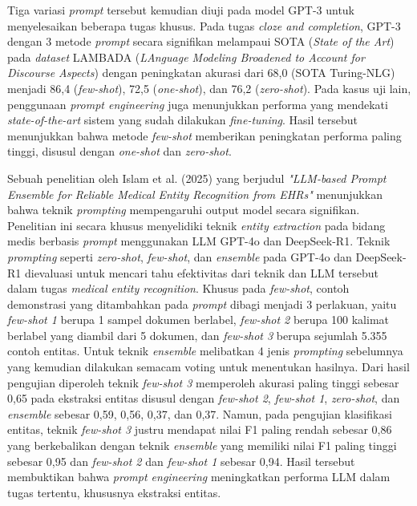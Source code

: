 Tiga variasi \textit{prompt} tersebut kemudian diuji pada model GPT-3 untuk menyelesaikan beberapa tugas khusus.
Pada tugas \textit{cloze and completion}, GPT-3 dengan 3 metode \textit{prompt} secara signifikan melampaui SOTA (\textit{State of the Art}) pada \textit{dataset}
LAMBADA (\textit{LAnguage Modeling Broadened to Account for Discourse Aspects}) dengan peningkatan akurasi dari 68,0 (SOTA Turing-NLG) menjadi 86,4 (\textit{few-shot}), 72,5 (\textit{one-shot}), dan 76,2 (\textit{zero-shot}).
Pada kasus uji lain, penggunaan \textit{prompt engineering} juga menunjukkan performa yang mendekati \textit{state-of-the-art} sistem yang sudah dilakukan \textit{fine-tuning}.
Hasil tersebut menunjukkan bahwa metode \textit{few-shot} memberikan peningkatan performa paling tinggi, disusul dengan \textit{one-shot} dan \textit{zero-shot}.

Sebuah penelitian oleh Islam et al. (2025) yang berjudul \textit{"LLM-based Prompt Ensemble for Reliable Medical Entity Recognition from EHRs"} menunjukkan bahwa teknik \textit{prompting} mempengaruhi output model secara signifikan.
Penelitian ini secara khusus menyelidiki teknik \textit{entity extraction} pada bidang medis berbasis \textit{prompt} menggunakan LLM GPT-4o dan DeepSeek-R1.
Teknik \textit{prompting} seperti \textit{zero-shot}, \textit{few-shot}, dan \textit{ensemble} pada GPT-4o dan DeepSeek-R1 dievaluasi untuk mencari tahu efektivitas dari teknik dan LLM tersebut dalam tugas \textit{medical entity recognition}.
Khusus pada \textit{few-shot}, contoh demonstrasi yang ditambahkan pada \textit{prompt} dibagi menjadi 3 perlakuan, yaitu \textit{few-shot 1} berupa 1 sampel dokumen berlabel, \textit{few-shot 2} berupa 100 kalimat berlabel yang diambil dari 5 dokumen, dan \textit{few-shot 3} berupa sejumlah 5.355 contoh entitas.
Untuk teknik \textit{ensemble} melibatkan 4 jenis \textit{prompting} sebelumnya yang kemudian dilakukan semacam voting untuk menentukan hasilnya.
Dari hasil pengujian diperoleh teknik \textit{few-shot 3} memperoleh akurasi paling tinggi sebesar 0,65 pada ekstraksi entitas disusul dengan \textit{few-shot 2}, \textit{few-shot 1}, \textit{zero-shot}, dan \textit{ensemble} sebesar 0,59, 0,56, 0,37, dan 0,37.
Namun, pada pengujian klasifikasi entitas, teknik \textit{few-shot 3} justru mendapat nilai F1 paling rendah sebesar 0,86 yang berkebalikan dengan teknik \textit{ensemble} yang memiliki nilai F1 paling tinggi sebesar 0,95 dan \textit{few-shot 2} dan \textit{few-shot 1} sebesar 0,94.
Hasil tersebut membuktikan bahwa \textit{prompt engineering} meningkatkan performa LLM dalam tugas tertentu, khususnya ekstraksi entitas.

